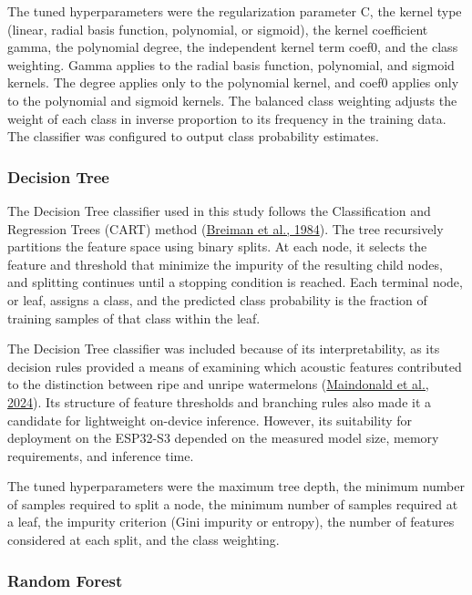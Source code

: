 \begin{thesisprose}
The tuned hyperparameters were the regularization parameter C, the kernel type (linear, radial basis function, polynomial, or sigmoid), the kernel coefficient gamma, the polynomial degree, the independent kernel term coef0, and the class weighting. Gamma applies to the radial basis function, polynomial, and sigmoid kernels. The degree applies only to the polynomial kernel, and coef0 applies only to the polynomial and sigmoid kernels. The balanced class weighting adjusts the weight of each class in inverse proportion to its frequency in the training data. The classifier was configured to output class probability estimates.

\subsubsection*{Decision Tree}

The Decision Tree classifier used in this study follows the Classification and Regression Trees (CART) method (\hyperlink{cite.breiman1984}{Breiman et al., 1984}). The tree recursively partitions the feature space using binary splits. At each node, it selects the feature and threshold that minimize the impurity of the resulting child nodes, and splitting continues until a stopping condition is reached. Each terminal node, or leaf, assigns a class, and the predicted class probability is the fraction of training samples of that class within the leaf.

The Decision Tree classifier was included because of its interpretability, as its decision rules provided a means of examining which acoustic features contributed to the distinction between ripe and unripe watermelons (\hyperlink{cite.maindonald2024}{Maindonald et al., 2024}). Its structure of feature thresholds and branching rules also made it a candidate for lightweight on-device inference. However, its suitability for deployment on the ESP32-S3 depended on the measured model size, memory requirements, and inference time.

The tuned hyperparameters were the maximum tree depth, the minimum number of samples required to split a node, the minimum number of samples required at a leaf, the impurity criterion (Gini impurity or entropy), the number of features considered at each split, and the class weighting.

\subsubsection*{Random Forest}


\end{thesisprose}
